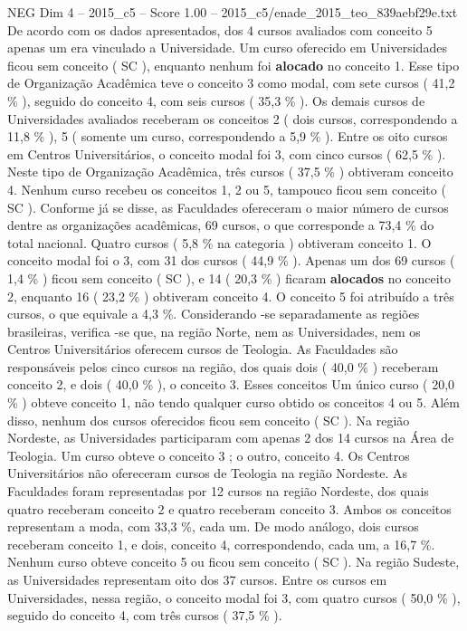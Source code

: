 \begin{textsample}{NEG Dim 4 – 2015\_c5 – Score 1.00 – 2015\_c5/enade\_2015\_teo\_839aebf29e.txt}
De acordo com os dados apresentados, dos 4 cursos avaliados com conceito 5 apenas um era vinculado a Universidade.
Um curso oferecido em Universidades ficou sem conceito ( SC ), enquanto nenhum foi \textbf{alocado} no conceito 1.
Esse tipo de Organização Acadêmica teve o conceito 3 como modal, com sete cursos ( 41,2 \% ), seguido do conceito 4, com seis cursos ( 35,3 \% ).
Os demais cursos de Universidades avaliados receberam os conceitos 2 ( dois cursos, correspondendo a 11,8 \% ), 5 ( somente um curso, correspondendo a 5,9 \% ).
Entre os oito cursos em Centros Universitários, o conceito modal foi 3, com cinco cursos ( 62,5 \% ).
Neste tipo de Organização Acadêmica, três cursos ( 37,5 \% ) obtiveram conceito 4.
Nenhum curso recebeu os conceitos 1, 2 ou 5, tampouco ficou sem conceito ( SC ).
Conforme já se disse, as Faculdades ofereceram o maior número de cursos dentre as organizações acadêmicas, 69 cursos, o que corresponde a 73,4 \% do total nacional.
Quatro cursos ( 5,8 \% na categoria ) obtiveram conceito 1.
O conceito modal foi o 3, com 31 dos cursos ( 44,9 \% ).
Apenas um dos 69 cursos ( 1,4 \% ) ficou sem conceito ( SC ), e 14 ( 20,3 \% ) ficaram \textbf{alocados} no conceito 2, enquanto 16 ( 23,2 \% ) obtiveram conceito 4.
O conceito 5 foi atribuído a três cursos, o que equivale a 4,3 \%.
Considerando -se separadamente as regiões brasileiras, verifica -se que, na região Norte, nem as Universidades, nem os Centros Universitários oferecem cursos de Teologia.
As Faculdades são responsáveis pelos cinco cursos na região, dos quais dois ( 40,0 \% ) receberam conceito 2, e dois ( 40,0 \% ), o conceito 3.
Esses conceitos Um único curso ( 20,0 \% ) obteve conceito 1, não tendo qualquer curso obtido os conceitos 4 ou 5.
Além disso, nenhum dos cursos oferecidos ficou sem conceito ( SC ).
Na região Nordeste, as Universidades participaram com apenas 2 dos 14 cursos na Área de Teologia.
Um curso obteve o conceito 3 ; o outro, conceito 4.
Os Centros Universitários não ofereceram cursos de Teologia na região Nordeste.
As Faculdades foram representadas por 12 cursos na região Nordeste, dos quais quatro receberam conceito 2 e quatro receberam conceito 3.
Ambos os conceitos representam a moda, com 33,3 \%, cada um.
De modo análogo, dois cursos receberam conceito 1, e dois, conceito 4, correspondendo, cada um, a 16,7 \%.
Nenhum curso obteve conceito 5 ou ficou sem conceito ( SC ).
Na região Sudeste, as Universidades representam oito dos 37 cursos.
Entre os cursos em Universidades, nessa região, o conceito modal foi 3, com quatro cursos ( 50,0 \% ), seguido do conceito 4, com três cursos ( 37,5 \% ).

\end{textsample}
